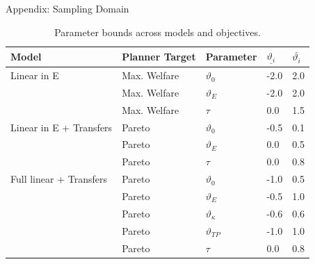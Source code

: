 \documentclass[10pt,aspectratio=169]{beamer}
\begin{document}
\begin{frame}[fragile]{Appendix: Sampling Domain}
\begin{table}[ht!]
\centering
\small
\begin{tabular}{lllll}
\toprule
Model & Planner Target & Parameter & $\underline{\vartheta_i}$ & $\bar{\vartheta_i}$ \\
\midrule
Linear in E & Max. Welfare & $\vartheta_0$     & -2.0   & 2.0   \\
            & Max. Welfare & $\vartheta_E$     & -2.0   & 2.0  \\
           & Max. Welfare & $\tau$         & 0.0  & 1.5  \\
            \midrule
Linear in E + Transfers & Pareto & $\vartheta_0$ & -0.5 & 0.1 \\
                        & Pareto & $\vartheta_E$ & 0.0    & 0.5 \\
                        & Pareto & $\tau$         & 0.0  & 0.8  \\
\midrule
Full linear + Transfers & Pareto & $\vartheta_0$     & -1.0   & 0.5 \\
                        & Pareto & $\vartheta_E$     & -0.5 & 1.0   \\
                        & Pareto & $\vartheta_\kappa$ & -0.6 & 0.6 \\
                        & Pareto & $\vartheta_{TP}$   & -1.0   & 1.0   \\
                        & Pareto & $\tau$         & 0.0  & 0.8  \\
\bottomrule
\end{tabular}
\caption{Parameter bounds across models and objectives.}
\label{tab:param_bounds_main}
\end{table}
\end{frame}
\end{document}
